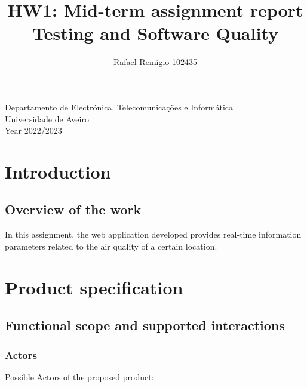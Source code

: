 \documentclass[12pt]{article}
\begin{document}
\begin{titlepage}

\title{%
  HW1: Mid-term assignment report\\
  \large  Testing and Software Quality\\}

\author{Rafael Remígio 102435}

\maketitle

\vfill
\begin{center}

	Departamento de Electrónica, Telecomunicações e Informática\\
       Universidade de Aveiro\\ Year 2022/2023
\end{center}



\end{titlepage}

\tableofcontents


\section{Introduction}

\subsection{Overview of the work} 

In this assignment, the web application developed provides real-time information parameters related to the air quality of a certain location.


\section{Product specification}


\subsection{Functional scope and supported interactions }


\subsubsection{Actors}

Possible Actors of the proposed product:
\end{document}
